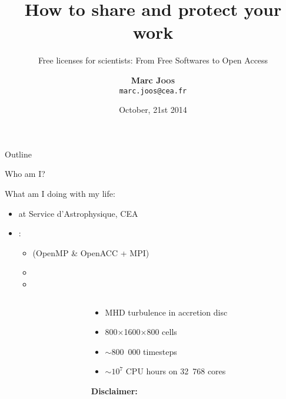 \documentclass[10pt,xcolor=svgnames]{beamer}
\title[Sharing \& protecting your work]{How to share and protect your work}
\subtitle{Free licenses for scientists: From Free Softwares to Open Access}
\author[M. \textsc{Joos}]{{\bf Marc \textsc{Joos}} \\ {\small\texttt{marc.joos@cea.fr}}}
\date[10/21/2014]{October, 21st 2014}
\begin{document}
\begin{frame}
  \titlepage
\end{frame}

\begin{frame}{Outline}
  \tableofcontents
\end{frame}

\begin{frame}{Who am I?}

  \begin{block}{What am I doing with my life:}
    \begin{itemize}
      \item {} at Service d'Astrophysique, CEA
      \item {}:
        \begin{itemize}
          \item {} (OpenMP \& OpenACC + MPI)
          \item {}
          \item {}
        \end{itemize}
    \end{itemize}
  \end{block}

  \begin{columns}
    \begin{column}{.5\textwidth}
    \end{column}
    \begin{column}{.5\textwidth}
      \scriptsize
      \begin{itemize}
        \item MHD turbulence in accretion disc
        \item 800$\times$1600$\times$800 cells
        \item $\sim$800~000 timesteps
        \item $\sim10^7$ CPU hours on 32~768 cores
      \end{itemize}

      \begin{alertblock}{}
        \begin{center}{\bfseries Disclaimer:}\end{center}
        
      \end{alertblock}
    \end{column}
  \end{columns}

\end{frame}
\end{document}
